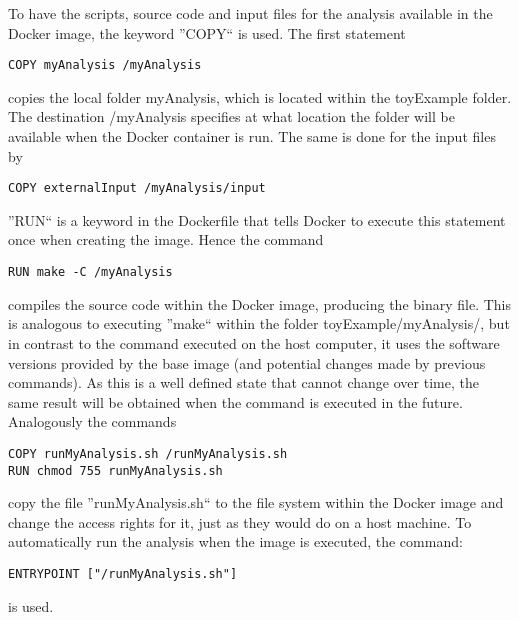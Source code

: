 \documentclass[a4paper, twoside, 11pt]{article}
\begin{document}
To have the scripts, source code and input files for the analysis available in the Docker image, the keyword ''COPY`` is used.
The first statement 
\begin{lstlisting}[basicstyle=\footnotesize\ttfamily,frame=single]
COPY myAnalysis /myAnalysis
\end{lstlisting}
copies the local folder myAnalysis, which is located within the toyExample folder. 
The destination /myAnalysis specifies at what location the folder will be available when the Docker container is run. 
The same is done for the input files by
\begin{lstlisting}[basicstyle=\footnotesize\ttfamily,frame=single]
COPY externalInput /myAnalysis/input 
\end{lstlisting}
''RUN`` is a keyword in the Dockerfile that tells Docker to execute this statement once when creating the image. 
Hence the command 
\begin{lstlisting}[basicstyle=\footnotesize\ttfamily,frame=single]
RUN make -C /myAnalysis
\end{lstlisting}
compiles the source code within the Docker image, producing the binary file. 
This is analogous to executing ''make`` within the folder toyExample/myAnalysis/, 
but in contrast to the command executed on the host computer, 
it uses the software versions provided by the base image 
(and potential changes made by previous commands). 
As this is a well defined state that cannot change over time, 
the same result will be obtained when the command is executed in the future. 
Analogously the commands
\begin{lstlisting}[basicstyle=\footnotesize\ttfamily,frame=single]
COPY runMyAnalysis.sh /runMyAnalysis.sh
RUN chmod 755 runMyAnalysis.sh
\end{lstlisting}
copy the file ''runMyAnalysis.sh`` to the file system within the Docker image and change the access rights for it, 
just as they would do on a host machine. 
To automatically run the analysis when the image is executed, the command:
\begin{lstlisting}[basicstyle=\footnotesize\ttfamily,frame=single]
ENTRYPOINT ["/runMyAnalysis.sh"]
\end{lstlisting}
is used.
\end{document}
